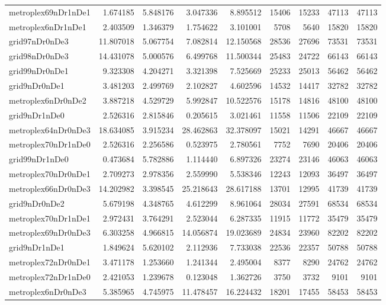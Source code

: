 \begin{longtable}{|l|r|r|r|r|r|r|r|r|}
metroplex69nDr1nDe1 & 1.674185 & 5.848176 & 3.047336 & 8.895512 & 15406 & 15233 & 47113 & 47113 \\
metroplex6nDr1nDe1 & 2.403509 & 1.346379 & 1.754622 & 3.101001 & 5708 & 5640 & 15820 & 15820 \\
grid97nDr0nDe3 & 11.807018 & 5.067754 & 7.082814 & 12.150568 & 28536 & 27696 & 73531 & 73531 \\
grid98nDr0nDe3 & 14.431078 & 5.000576 & 6.499768 & 11.500344 & 25483 & 24722 & 66143 & 66143 \\
grid99nDr0nDe1 & 9.323308 & 4.204271 & 3.321398 & 7.525669 & 25233 & 25013 & 56462 & 56462 \\
grid9nDr0nDe1 & 3.481203 & 2.499769 & 2.102827 & 4.602596 & 14532 & 14417 & 32782 & 32782 \\
metroplex6nDr0nDe2 & 3.887218 & 4.529729 & 5.992847 & 10.522576 & 15178 & 14816 & 48100 & 48100 \\
grid9nDr1nDe0 & 2.526316 & 2.815846 & 0.205615 & 3.021461 & 11558 & 11506 & 22109 & 22109 \\
metroplex64nDr0nDe3 & 18.634085 & 3.915234 & 28.462863 & 32.378097 & 15021 & 14291 & 46667 & 46667 \\
metroplex70nDr1nDe0 & 2.526316 & 2.256586 & 0.523975 & 2.780561 & 7752 & 7690 & 20406 & 20406 \\
grid99nDr1nDe0 & 0.473684 & 5.782886 & 1.114440 & 6.897326 & 23274 & 23146 & 46063 & 46063 \\
metroplex70nDr0nDe1 & 2.709273 & 2.978356 & 2.559990 & 5.538346 & 12243 & 12093 & 36497 & 36497 \\
metroplex66nDr0nDe3 & 14.202982 & 3.398545 & 25.218643 & 28.617188 & 13701 & 12995 & 41739 & 41739 \\
grid9nDr0nDe2 & 5.679198 & 4.348765 & 4.612299 & 8.961064 & 28034 & 27591 & 68534 & 68534 \\
metroplex70nDr1nDe1 & 2.972431 & 3.764291 & 2.523044 & 6.287335 & 11915 & 11772 & 35479 & 35479 \\
metroplex69nDr0nDe3 & 6.303258 & 4.966815 & 14.056874 & 19.023689 & 24834 & 23960 & 82202 & 82202 \\
grid9nDr1nDe1 & 1.849624 & 5.620102 & 2.112936 & 7.733038 & 22536 & 22357 & 50788 & 50788 \\
metroplex72nDr0nDe1 & 3.471178 & 1.253660 & 1.241344 & 2.495004 & 8377 & 8290 & 24762 & 24762 \\
metroplex72nDr1nDe0 & 2.421053 & 1.239678 & 0.123048 & 1.362726 & 3750 & 3732 & 9101 & 9101 \\
metroplex6nDr0nDe3 & 5.385965 & 4.745975 & 11.478457 & 16.224432 & 18201 & 17455 & 58453 & 58453 \\

\end{longtable}
